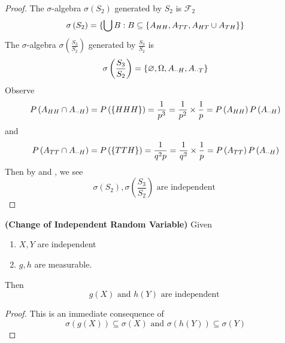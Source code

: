 \documentclass{report}
\begin{document}
\begin{proof}
The $\sigma$-algebra $\sigma\left(S_2 \right)$ generated by $S_2$ is $\mathcal{F}_2$
\begin{equation*}
\sigma\left(S_2 \right)=\{ \bigcup B:B\subseteq \{ A_{HH},A_{TT},A_{HT}\cup A_{TH} \} \}
\end{equation*}
The $\sigma$-algebra $\sigma\left(\frac{S_3}{S_2} \right)$ generated by $\frac{S_3}{S_2}$ is 
\begin{equation*}
\sigma\left(\frac{S_3}{S_2} \right)=\{ \varnothing,\Omega, A_{\cdot \cdot H},A_{\cdot \cdot T} \}
\end{equation*}
Observe 
\begin{equation*}
P\left(A_{HH}\cap  A_{\cdot \cdot H} \right)=P\left(\{ HHH \} \right)=\frac{1}{p^3}=\frac{1}{p^2}\times \frac{1}{p}=P\left(A_{HH} \right)P\left(A_{\cdot \cdot H} \right)
\end{equation*}
and 
\begin{equation*}
P\left(A_{TT}\cap A_{\cdot \cdot H} \right)=P\left(\{ TTH \} \right)=\frac{1}{q^2p}=\frac{1}{q^2}\times \frac{1}{p}=P\left(A_{TT} \right)P\left(A_{\cdot \cdot H} \right)
\end{equation*}
Then by  and , we see 
\begin{equation*}
\sigma \left(S_2 \right),\sigma \left(\frac{S_3}{S_2} \right)\text{ are independent }
\end{equation*}
\end{proof}
\begin{theorem}
\label{3.2.4}
\textbf{(Change of Independent Random Variable)} Given 
\begin{enumerate}[label=(\alph*)]
  \item $X,Y$ are independent
  \item $g,h$ are measurable.  
\end{enumerate}
Then
\begin{equation*}
g\left(X \right)\text{ and }h\left(Y \right)\text{ are independent }
\end{equation*}
\end{theorem}
\begin{proof}
This is an immediate consequence of 
\begin{equation*}
\sigma \left(g\left(X \right) \right)\subseteq \sigma \left(X \right)\text{ and }\sigma \left(h\left(Y \right) \right)\subseteq \sigma \left(Y \right)
\end{equation*}
\end{proof}
\end{document}
